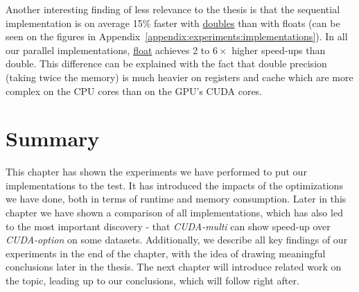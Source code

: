 Another interesting finding of less relevance to the thesis is that the sequential implementation is on average 15\% faster with \underline{doubles} than with floats (can be seen on the figures in Appendix~\ref{appendix:experiments:implementations}). In all our parallel implementations, \underline{float} achieves 2 to $6\times$ higher speed-ups than double. This difference can be explained with the fact that double precision (taking twice the memory) is much heavier on registers and cache which are more complex on the CPU cores than on the GPU's CUDA cores. 

\section*{Summary}
This chapter has shown the experiments we have performed to put our implementations to the test. It has introduced the impacts of the optimizations we have done, both in terms of runtime and memory consumption. Later in this chapter we have shown a comparison of all implementations, which has also led to the most important discovery - that \textit{CUDA-multi} can show speed-up over \textit{CUDA-option} on some datasets. Additionally, we describe all key findings of our experiments in the end of the chapter, with the idea of drawing meaningful conclusions later in the thesis. The next chapter will introduce related work on the topic, leading up to our conclusions, which will follow right after.